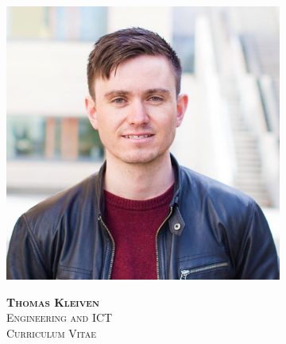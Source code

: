 \documentclass[a4paper, norsk, 9.8pt]{article} %
\title{}
\author{}
\date{}
\begin{document}

\begin{figure}[h]
\begin{subfigure}[b]{2.7cm}
\includegraphics[scale = 0.064]{bilde_1.jpg}
\end{subfigure}
\begin{subfigure}[b]{9cm}
   	\textsc{\bfseries{\Huge{Thomas Kleiven}}} \\[5pt]
   	\textsc{\Large{Engineering and ICT}} \\[5pt]
   	\textsc{\Large{Curriculum Vitae}}
\end{subfigure}
\end{figure}
\end{document}
